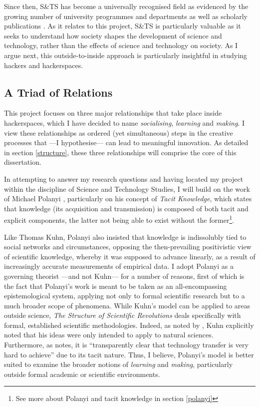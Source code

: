 Since then, S\&TS has become a universally recognised field as evidenced by the growing number of university programmes and departments as well as scholarly publications \citep{besselaar00}. As it relates to this project, S\&TS is particularly valuable as it seeks to understand how society shapes the development of science and technology, rather than the effects of science and technology on society. As I argue next, this outside-to-inside approach is particularly insightful in studying hackers and hackerspaces.


\subsection{A Triad of Relations}

This project focuses on three major relationships that take place inside hackerspaces, which I have decided to name \textit{socialising}, \textit{learning} and \textit{making}. I view these relationships as ordered (yet simultaneous) steps in the creative processes that ---I hypothesise--- can lead to meaningful innovation. As detailed in section \ref{structure}, these three relationships will comprise the core of this dissertation.

In attempting to answer my research questions and having located my project within the discipline of Science and Technology Studies, I will build on the work of Michael Polanyi \citeyearpar{polanyi58,polanyi66}, particularly on his concept of \textit{Tacit Knowledge}, which states that knowledge (its acquisition and transmission) is composed of both tacit and explicit components, the latter not being able to exist without the former\footnote{See more about Polanyi and tacit knowledge in section \ref{polanyi}}.

Like Thomas Kuhn, Polanyi also insisted that knowledge is indissolubly tied to social networks and circumstances, opposing the then-prevail\-ing positivistic view of scientific knowledge, whereby it was supposed to advance linearly, as a result of increasingly accurate measurements of empirical data. I adopt Polanyi as a governing theorist ---and not Kuhn--- for a number of reasons, first of which is the fact that Polanyi's work is meant to be taken as an all-encompassing epistemological system, applying not only to formal scientific research but to a much broader scope of phenomena. While Kuhn's model can be applied to areas outside science, \textit{The Structure of Scientific Revolutions} deals specifically with formal, established scientific methodologies. Indeed, as noted by \citet{gutting84}, Kuhn explicitly noted that his ideas were only intended to apply to natural sciences. Furthermore, as \citet{laudan84b} notes, it is ``transparently clear that technology transfer is very hard to achieve'' due to its tacit nature. Thus, I believe, Polanyi's model is better suited to examine the broader notions of \textit{learning} and \textit{making}, particularly outside formal academic or scientific environments.

